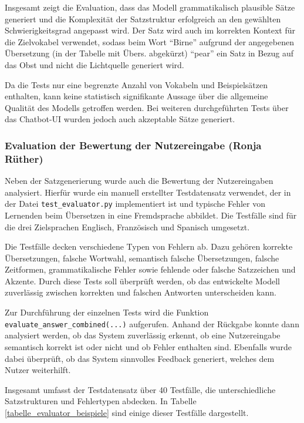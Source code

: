 Insgesamt zeigt die Evaluation, dass das Modell grammatikalisch plausible Sätze generiert und die Komplexität der Satzstruktur erfolgreich an den gewählten
Schwierigkeitsgrad angepasst wird. Der Satz wird auch im korrekten Kontext für die Zielvokabel verwendet, sodass beim Wort \enquote{Birne} aufgrund der angegebenen 
Übersetzung (in der Tabelle mit Übers. abgekürzt) \enquote{pear} ein Satz in Bezug auf das Obst und nicht die Lichtquelle generiert wird.

Da die Tests nur eine begrenzte Anzahl von Vokabeln und Beispielsätzen enthalten, kann keine statistisch signifikante Aussage über die allgemeine 
Qualität des Modells getroffen werden. Bei weiteren durchgeführten Tests über das Chatbot-UI wurden jedoch auch akzeptable Sätze generiert.

\subsubsection{Evaluation der Bewertung der Nutzereingabe (Ronja Rüther)}
Neben der Satzgenerierung wurde auch die Bewertung der Nutzereingaben analysiert.
Hierfür wurde ein manuell erstellter Testdatensatz verwendet, der in der Datei \texttt{test\_evaluator.py} implementiert ist und typische Fehler von Lernenden beim Übersetzen in eine Fremdsprache abbildet.
Die Testfälle sind für die drei Zielsprachen Englisch, Französisch und Spanisch umgesetzt.

Die Testfälle decken verschiedene Typen von Fehlern ab. Dazu gehören korrekte Übersetzungen, falsche Wortwahl, semantisch falsche Übersetzungen, falsche Zeitformen, grammatikalische Fehler sowie fehlende oder falsche Satzzeichen und Akzente.
Durch diese Tests soll überprüft werden, ob das entwickelte Modell zuverlässig zwischen korrekten und falschen Antworten unterscheiden kann.

Zur Durchführung der einzelnen Tests wird die Funktion \texttt{evaluate\_answer\_combined(...)} aufgerufen. 
Anhand der Rückgabe konnte dann analysiert werden, ob das System zuverlässig erkennt, ob eine Nutzereingabe semantisch korrekt ist oder nicht und ob Fehler enthalten sind.
Ebenfalls wurde dabei überprüft, ob das System sinnvolles Feedback generiert, welches dem Nutzer weiterhilft.

Insgesamt umfasst der Testdatensatz über 40 Testfälle, die unterschiedliche Satzstrukturen und Fehlertypen abdecken. In Tabelle \ref{tabelle_evaluator_beispiele} sind einige dieser Testfälle dargestellt.


